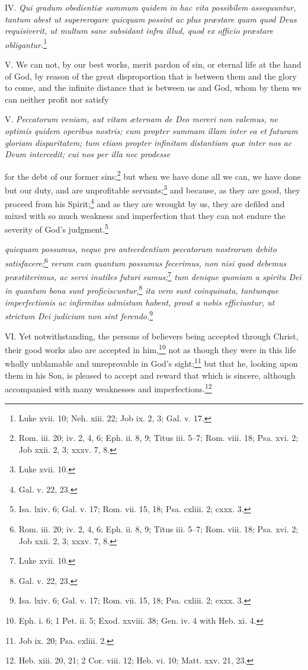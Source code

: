 IV. \emph{Qui gradum obedientiæ summum quidem in hac vita possibilem assequuntur, tantum abest ut supererogare quicquam possint ac plus præstare quam quod Deus requisiverit, ut multum sane subsidant infra illud, quod ex officio præstare obligantur.}\footnote{Luke xvii. 10; Neh. xiii. 22; Job ix. 2, 3; Gal. v. 17.}

V. We can not, by our best works, merit pardon of sin, or eternal life at the hand of God, by reason of the great disproportion that is between them and the glory to come, and the infinite distance that is between us and God, whom by them we can neither profit nor satisfy

V. \emph{Peccatorum veniam, aut vitam æternam de Deo mereri non valemus, ne optimis quidem operibus nostris; cum propter summam illam inter ea et futuram gloriam disparitatem; tum etiam propter infinitam distantiam quæ inter nos ac Deum intercedit; cui nos per illa nec prodesse }

for the debt of our former sins;\footnote{Rom. iii. 20; iv. 2, 4, 6; Eph. ii. 8, 9; Titus iii. 5–7; Rom. viii. 18; Psa. xvi. 2; Job xxii. 2, 3; xxxv. 7, 8.} but when we have done all we can, we have done but our duty, and are unprofitable servants;\footnote{Luke xvii. 10.} and because, as they are good, they proceed from his Spirit;\footnote{Gal. v. 22, 23.} and as they are wrought by us, they are defiled and mixed with so much weakness and imperfection that they can not endure the severity of God's judgment.\footnote{Isa. lxiv. 6; Gal. v. 17; Rom. vii. 15, 18; Psa. cxliii. 2; cxxx. 3.}

\emph{quicquam possumus, neque pro antecedentium peccatorum nostrorum debito satisfacere;}\footnote{Rom. iii. 20; iv. 2, 4, 6; Eph. ii. 8, 9; Titus iii. 5–7; Rom. viii. 18; Psa. xvi. 2; Job xxii. 2, 3; xxxv. 7, 8.}\emph{ verum cum quantum possumus fecerimus, non nisi quod debemus præstiterimus, ac servi inutiles futuri sumus;}\footnote{Luke xvii. 10.}\emph{ tum denique quoniam a spiritu Dei in quantum bona sunt proficiscuntur,}\footnote{Gal. v. 22, 23.}\emph{ ita vero sunt coinquinata, tantumque imperfectionis ac infirmitas admistum habent, prout a nobis efficiuntur, ut strictum Dei judicium non sint ferendo.}\footnote{Isa. lxiv. 6; Gal. v. 17; Rom. vii. 15, 18; Psa. cxliii. 2; cxxx. 3.}

VI. Yet notwithstanding, the persons of believers being accepted through Christ, their good works also are accepted in him,\footnote{Eph. i. 6; 1 Pet. ii. 5; Exod. xxviii. 38; Gen. iv. 4 with Heb. xi. 4.} not as though they were in this life wholly unblamable and unreprovable in God's sight;\footnote{Job ix. 20; Psa. cxliii. 2.} but that he, looking upon them in his Son, is pleased to accept and reward that which is sincere, although accompanied with many weaknesses and imperfections.\footnote{Heb. xiii. 20, 21; 2 Cor. viii. 12; Heb. vi. 10; Matt. xxv. 21, 23.}

